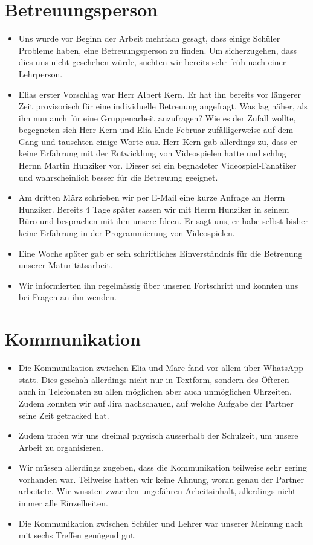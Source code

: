 \section{Betreuungsperson}
\begin{itemize}
    \item Uns wurde vor Beginn der Arbeit mehrfach gesagt, dass einige Schüler Probleme haben, eine Betreuungsperson zu finden. Um sicherzugehen, dass dies uns nicht geschehen würde, suchten wir bereits sehr früh nach einer Lehrperson.
    \item Elias erster Vorschlag war Herr Albert Kern. Er hat ihn bereits vor längerer Zeit provisorisch für eine individuelle Betreuung angefragt. Was lag näher, als ihn nun auch für eine Gruppenarbeit anzufragen? Wie es der Zufall wollte, begegneten sich 
    Herr Kern und Elia Ende Februar zufälligerweise auf dem Gang und tauschten einige Worte aus. Herr Kern gab allerdings zu, dass er keine Erfahrung mit der Entwicklung von Videospielen hatte und schlug Hernn Martin Hunziker vor.
    Dieser sei ein begnadeter Videospiel-Fanatiker und wahrscheinlich besser für die Betreuung geeignet. 
    \item Am dritten März schrieben wir per E-Mail eine kurze Anfrage an Herrn Hunziker. 
    Bereits 4 Tage später sassen wir mit Herrn Hunziker in seinem Büro und besprachen mit ihm unsere Ideen. Er sagt uns, er habe selbst bisher keine Erfahrung in der Programmierung von Videospielen.
    \item Eine Woche später gab er sein schriftliches Einverständnis für die Betreuung unserer Maturitätsarbeit. 
    \item Wir informierten ihn regelmässig über unseren Fortschritt und konnten uns bei Fragen an ihn wenden.
\end{itemize}

\section{Kommunikation}
\begin{itemize}
    \item Die Kommunikation zwischen Elia und Marc fand vor allem über WhatsApp statt. Dies geschah allerdings nicht nur in Textform, sondern des Öfteren auch in Telefonaten zu allen möglichen aber auch unmöglichen Uhrzeiten. Zudem konnten wir auf Jira nachschauen, auf welche Aufgabe der Partner
    seine Zeit getracked hat. 
    \item Zudem trafen wir uns dreimal physisch ausserhalb der Schulzeit, um unsere Arbeit zu organisieren.
    \item Wir müssen allerdings zugeben, dass die Kommunikation teilweise sehr gering vorhanden war. Teilweise hatten wir keine Ahnung, woran genau der Partner arbeitete. Wir wussten zwar den ungefähren Arbeitsinhalt, allerdings nicht immer alle Einzelheiten.
    \item Die Kommunikation zwischen Schüler und Lehrer war unserer Meinung nach mit sechs Treffen genügend gut.
\end{itemize}



